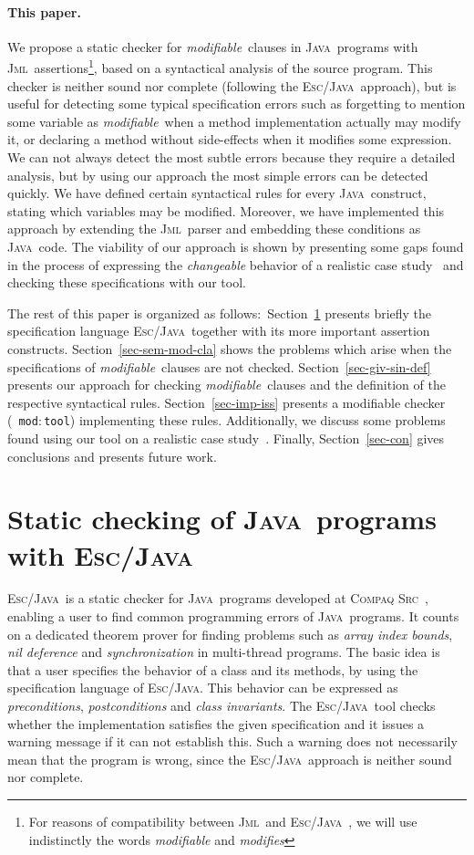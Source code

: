 \documentclass[a4paper]{llncs}
\newcommand{\jml}{\textsc{Jml}}
\newcommand{\escj}{\textsc{Esc/Java}}
\newcommand{\java}{\textsc{Java}}
\newcommand{\csrc}{\textsc{Compaq Src}}
\newcommand{\modtool}{\texttt{mod$:$tool}}
\newcommand{\modif}{\textit{modifiable}}
\begin{document}
\paragraph{\bf This paper.}We propose a static checker for
\modif~clauses in \java~programs with \jml~assertions\footnote{For
reasons of compatibility between \jml~and \escj~, we will 
use indistinctly the words \emph{modifiable} and \emph{modifies}},
based on a syntactical analysis of the source program. This
checker is neither sound nor complete (following the \escj~approach),
but is useful
for detecting some typical specification errors such as
forgetting to mention some variable
as \modif~when a method implementation actually may modify it, or
declaring a method without side-effects when it modifies some
expression. We can not always detect the most subtle errors because they 
require a detailed analysis, but by using our approach the most
simple errors can be detected quickly. We have defined certain
syntactical rules for every \java~construct, stating which
variables may be modified. Moreover, we have implemented
this approach by extending the \jml~parser and embedding these
conditions as \java~code. The viability of our approach is
shown by presenting some gaps found in the process of expressing the
\emph{changeable} behavior of a realistic case study~\cite{CH02} and
checking these specifications with our tool.


The rest of this paper is organized as follows$:$
Section~\ref{sec-esc-prg} presents briefly the specification language
\escj~together with its more important assertion
constructs. Section~\ref{sec-sem-mod-cla} shows the problems which
arise when the specifications of \modif~clauses are not
checked. Section~\ref{sec-giv-sin-def}
presents our approach for checking \modif~clauses and the definition
of the respective syntactical rules. Section~\ref{sec-imp-iss}
presents a modifiable checker (~\modtool) implementing these
rules. Additionally, we discuss some problems found using our tool on a
realistic case study~\cite{CH02}.
Finally, Section~\ref{sec-con}
gives conclusions and presents future work. 






\section{Static checking of \java~programs with \escj}
\label{sec-esc-prg}
\escj~is a static checker for \java~programs developed
at \csrc~\cite{ESC}, enabling a user to find common programming
errors of \java~programs. It counts on a dedicated theorem prover for
finding problems such as \emph{array index bounds},
\emph{nil deference} and \emph{synchronization} in multi-thread
programs. The basic idea is that
a user specifies the behavior of a class and its methods, by
using the specification language of \escj. This
behavior can be expressed as \textit{preconditions},
\textit{postconditions} and \textit{class invariants}. The \escj~tool
checks whether the implementation satisfies the given
specification and it issues a warning 
message if it can not establish this. Such a
warning does not necessarily mean that the program is
wrong, since the \escj~approach is neither sound nor
complete. 
\end{document}
